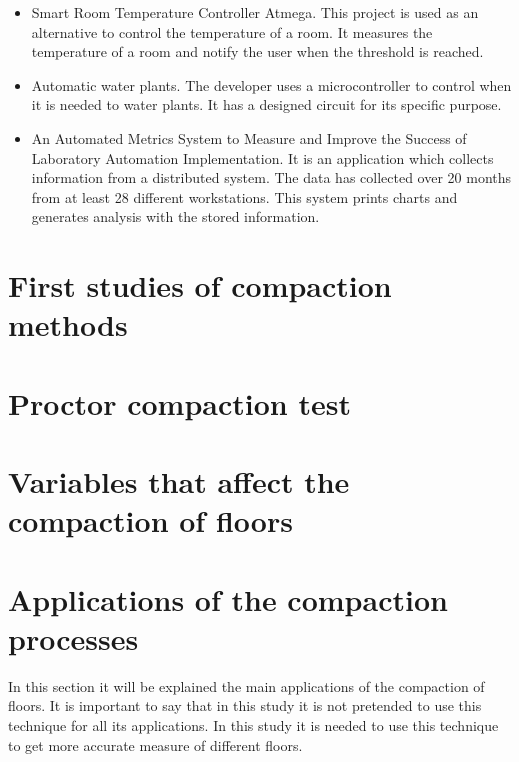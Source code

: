 \begin{itemize}

\item Smart Room Temperature Controller Atmega\cite{smart_room_controller}. This project is used as an alternative to control the temperature of a room. It measures the temperature of a room and notify the user when the threshold is reached.

\item Automatic water plants\cite{diy_blokefollow_watering_nodate}. The developer uses a microcontroller to control when it is needed to water plants. It has a designed circuit for its specific purpose.

\item An Automated Metrics System to Measure and Improve the Success of Laboratory Automation Implementation\cite{benn_automated_2006}. It is an application which collects information from a distributed system. The data has collected over 20 months from at least 28 different workstations. This system prints charts and generates analysis with the stored information.

\end{itemize}

\section{First studies of compaction methods}

\section{Proctor compaction test}

\section{Variables that affect the compaction of floors}

\section{Applications of the compaction processes}

In this section it will be explained the main applications of the compaction of floors. It is important to say that in this study it is not pretended to use this technique for all its applications. In this study it is needed to use this technique to get more accurate measure of different floors.\\

